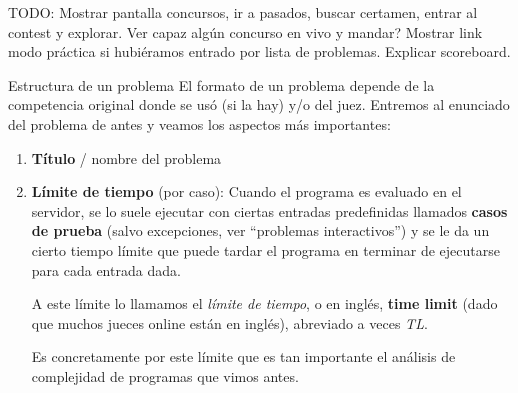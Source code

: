 \documentclass{beamer}
\begin{document}
    \begin{frame}[noframenumbering]
        TODO: Mostrar pantalla concursos, ir a pasados, buscar certamen, entrar al contest y explorar. Ver capaz algún concurso en vivo y mandar? Mostrar link modo práctica si hubiéramos entrado por lista de problemas. Explicar scoreboard.
    \end{frame}

    \begin{frame}{Estructura de un problema}
        El formato de un problema depende de la competencia original donde se usó (si la hay) y/o del juez. \pause Entremos al enunciado del problema de antes y veamos los aspectos más importantes: \pause

        \begin{enumerate}
            \item \textbf{Título} / nombre del problema \pause
            \begin{center}
            \end{center}\pause

        \item \textbf{Límite de tiempo} (por caso): \pause Cuando el programa es evaluado en el servidor, se lo suele ejecutar con ciertas entradas predefinidas llamados \textbf{casos de prueba} (salvo excepciones, ver ``problemas interactivos'') y se le da un cierto tiempo límite que puede tardar el programa en terminar de ejecutarse para cada entrada dada. \pause

            A este límite lo llamamos el \textit{límite de tiempo}, o en inglés, \textbf{time limit} (dado que muchos jueces online están en inglés), abreviado a veces \textit{TL}. \pause

            Es concretamente por este límite que es tan importante el análisis de complejidad de programas que vimos antes.

        \end{enumerate}
    \end{frame}
\end{document}
